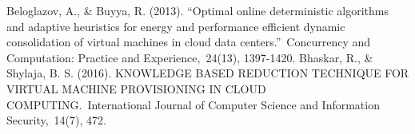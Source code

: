 
\begin{thebibliography}{99}


\begin{LTRbibitems}
\resetlatinfont
	  Beloglazov, A., \& Buyya, R. (2013). “Optimal online deterministic algorithms and adaptive heuristics for energy and performance efficient dynamic consolidation of virtual machines in cloud data centers.” Concurrency and Computation: Practice and Experience, 24(13), 1397-1420.
	 Bhaskar, R., \& Shylaja, B. S. (2016). KNOWLEDGE BASED REDUCTION TECHNIQUE FOR VIRTUAL MACHINE PROVISIONING IN CLOUD COMPUTING. International Journal of Computer Science and Information Security, 14(7), 472.
	 	

\end{LTRbibitems}
\end{thebibliography}
